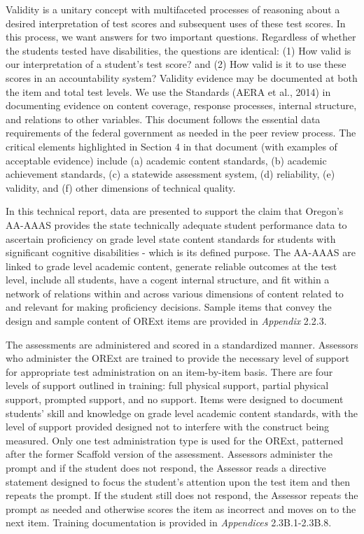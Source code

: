 \documentclass[]{article}
\begin{document}
Validity is a unitary concept with multifaceted processes of reasoning
about a desired interpretation of test scores and subsequent uses of
these test scores. In this process, we want answers for two important
questions. Regardless of whether the students tested have disabilities,
the questions are identical: (1) How valid is our interpretation of a
student's test score? and (2) How valid is it to use these scores in an
accountability system? Validity evidence may be documented at both the
item and total test levels. We use the Standards (AERA et al., 2014) in
documenting evidence on content coverage, response processes, internal
structure, and relations to other variables. This document follows the
essential data requirements of the federal government as needed in the
peer review process. The critical elements highlighted in Section 4 in
that document (with examples of acceptable evidence) include (a)
academic content standards, (b) academic achievement standards, (c) a
statewide assessment system, (d) reliability, (e) validity, and (f)
other dimensions of technical quality.

In this technical report, data are presented to support the claim that
Oregon's AA-AAAS provides the state technically adequate student
performance data to ascertain proficiency on grade level state content
standards for students with significant cognitive disabilities - which
is its defined purpose. The AA-AAAS are linked to grade level academic
content, generate reliable outcomes at the test level, include all
students, have a cogent internal structure, and fit within a network of
relations within and across various dimensions of content related to and
relevant for making proficiency decisions. Sample items that convey the
design and sample content of ORExt items are provided in \emph{Appendix}
2.2.3.

The assessments are administered and scored in a standardized manner.
Assessors who administer the ORExt are trained to provide the necessary
level of support for appropriate test administration on an item-by-item
basis. There are four levels of support outlined in training: full
physical support, partial physical support, prompted support, and no
support. Items were designed to document students' skill and knowledge
on grade level academic content standards, with the level of support
provided designed not to interfere with the construct being measured.
Only one test administration type is used for the ORExt, patterned after
the former Scaffold version of the assessment. Assessors administer the
prompt and if the student does not respond, the Assessor reads a
directive statement designed to focus the student's attention upon the
test item and then repeats the prompt. If the student still does not
respond, the Assessor repeats the prompt as needed and otherwise scores
the item as incorrect and moves on to the next item. Training
documentation is provided in \emph{Appendices} 2.3B.1-2.3B.8.
\end{document}
